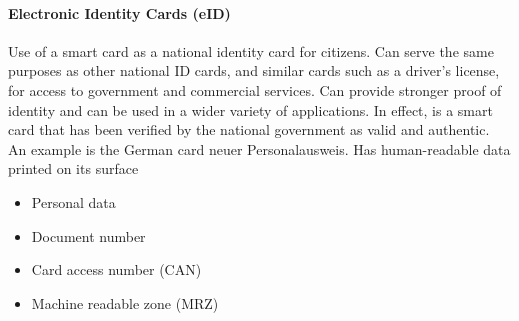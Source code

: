 \documentclass{article}
\begin{document}
                        \paragraph{Electronic Identity Cards (eID)}
                        Use of a smart card as a national identity card for
                        citizens.
                        Can serve the same purposes as other national ID cards, and
                        similar cards such as a driver’s license, for access to government
                        and commercial services.
                        Can provide stronger proof of identity and can be used in a wider
                        variety of applications.
                        In effect, is a smart card that has been verified by the national
                        government as valid and authentic. An example is the German card neuer
                        Personalausweis. Has human-readable data printed on its surface
                        \begin{itemize}
                            \item Personal data
                            \item Document number
                            \item Card access number (CAN)
                            \item Machine readable zone (MRZ)
                        \end{itemize}
\end{document}
